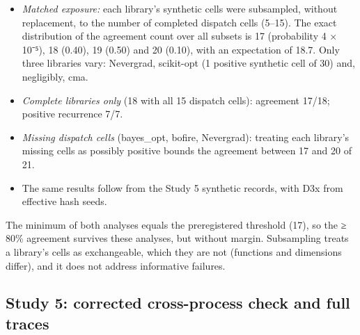 \documentclass[acmsmall,screen,review,anonymous=false]{acmart}
\providecommand{\tightlist}{\setlength{\itemsep}{0pt}\setlength{\parskip}{0pt}}
\begin{document}
\begin{itemize}
\tightlist
\item
  \emph{Matched exposure:} each library's synthetic cells were subsampled, without replacement, to the number of
  completed dispatch cells (5--15). The exact distribution of the agreement count over all subsets is 17 (probability
  4 × 10⁻⁵), 18 (0.40), 19 (0.50) and 20 (0.10), with an expectation of 18.7. Only three libraries vary: Nevergrad,
  scikit-opt (1 positive synthetic cell of 30) and, negligibly, cma.
\item
  \emph{Complete libraries only} (18 with all 15 dispatch cells): agreement 17/18; positive recurrence 7/7.
\item
  \emph{Missing dispatch cells} (bayes\_opt, bofire, Nevergrad): treating each library's missing cells as possibly
  positive bounds the agreement between 17 and 20 of 21.
\item
  The same results follow from the Study 5 synthetic records, with D3x from effective hash seeds.
\end{itemize}

The minimum of both analyses equals the preregistered threshold (17), so the ≥ 80\% agreement survives these
analyses, but without margin. Subsampling treats a library's cells as exchangeable, which they are not (functions
and dimensions differ), and it does not address informative failures.

\subsection{Study 5: corrected cross-process check and full traces}\label{study-5-corrected-cross-process-check-and-full-traces}
\end{document}
